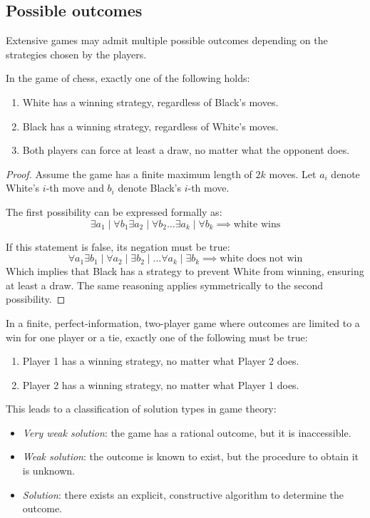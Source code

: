 \subsection{Possible outcomes}
Extensive games may admit multiple possible outcomes depending on the strategies chosen by the players.
\begin{theorem}
    In the game of chess, exactly one of the following holds:
    \begin{enumerate}
        \item White has a winning strategy, regardless of Black's moves.
        \item Black has a winning strategy, regardless of White's moves.
        \item Both players can force at least a draw, no matter what the opponent does.
    \end{enumerate}
\end{theorem}
\begin{proof}
    Assume the game has a finite maximum length of $2k$ moves. 
    Let $a_i$ denote White's $i$-th move and $b_i$ denote Black's $i$-th move.
    
    The first possibility can be expressed formally as:
    \[\exists a_1 \mid \forall b_1 \exists a_2 \mid \forall b_2 \dots \exists a_k \mid \forall b_k \implies \text{white wins}\]
    
    If this statement is false, its negation must be true:
    \[\forall a_1 \exists b_1 \mid \forall a_2 \mid \exists b_2 \mid \dots \forall a_k \mid \exists b_k \implies \text{white does not win}\]
    Which implies that Black has a strategy to prevent White from winning, ensuring at least a draw. 
    The same reasoning applies symmetrically to the second possibility.
\end{proof}
\begin{corollary}
    In a finite, perfect-information, two-player game where outcomes are limited to a win for one player or a tie, exactly one of the following must be true:
    \begin{enumerate}
        \item Player 1 has a winning strategy, no matter what Player 2 does.
        \item Player 2 has a winning strategy, no matter what Player 1 does.
    \end{enumerate}
\end{corollary}
\noindent This leads to a classification of solution types in game theory:
\begin{itemize}
    \item \textit{Very weak solution}: the game has a rational outcome, but it is inaccessible.
    \item \textit{Weak solution}: the outcome is known to exist, but the procedure to obtain it is unknown.
    \item \textit{Solution}: there exists an explicit, constructive algorithm to determine the outcome.
\end{itemize}